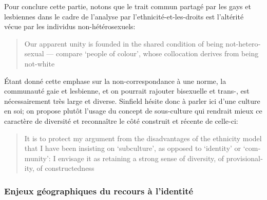 Pour conclure cette partie, notons que le trait commun partagé par les gays et lesbiennes dans le cadre de l'analyse par l'ethnicité-et-les-droits est l'altérité vécue par les individus non-hétérosexuels:
\foreignblockquote{english}[{\cite[289]{Sinfield1996}}][.]{Our apparent unity is
  founded in the shared condition of being not-heterosexual --- compare `people
  of colour', whose collocation derives from being not-white}. 
Étant donné cette emphase sur la non-correspondance à une norme, la communauté gaie et lesbienne, et on pourrait rajouter bisexuelle et trans-, est nécessairement très large et diverse. 
Sinfield hésite donc à parler ici d'une culture en soi; on propose plutôt l'usage du concept de sous-culture qui rendrait mieux ce caractère de diversité et reconnaître le côté construit et récente de celle-ci:
\foreignblockquote{english}[{\cite[289]{Sinfield1996}}][.]{It is to protect my
  argument from the disadvantages of the ethnicity model that I have been
  insisting on `subculture', as opposed to `identity' or `community': I envisage
  it as retaining a strong sense of diversity, of provisionality, of
  constructedness}.



\subsubsection{Enjeux géographiques du recours à l'identité}
\label{sec:enjeux_g_ographiques_du_recours_l_identit_} 

